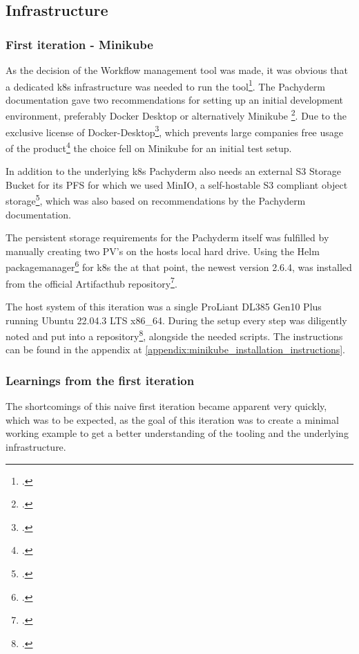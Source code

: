 
\subsection{Infrastructure}


\subsubsection{First iteration - Minikube}
\label{minikube}
As the decision of the Workflow management tool was made, it was obvious that a dedicated \ac{k8s} infrastructure was needed to run the tool\footcite{PachydermDocsOnPrem}.
The Pachyderm documentation gave two recommendations for setting up an initial development environment, preferably Docker Desktop or alternatively Minikube \footcite{PachydermDocsLocal}.
Due to the exclusive license of Docker-Desktop\footcite{DockerTermsService2022},
which prevents large companies free usage of the product\footcite{DockerFAQsDocker2021} the choice fell on Minikube for an initial test setup.

In addition to the underlying \ac{k8s} Pachyderm also needs an external S3 Storage Bucket for its \ac{PFS} for which we used MinIO,
a self-hostable S3 compliant object storage\footcite{incMinIOMinIOKubernetes}, which was also based on recommendations by the Pachyderm documentation.

The persistent storage requirements for the Pachyderm itself was fulfilled by manually creating two \ac{PV}'s on the hosts local hard drive.
Using the Helm packagemanager\footcite{HelmDocsHome} for \ac{k8s} the at that point, the newest version 2.6.4, was installed from the official Artifacthub repository\footcite{ArtifacthubPachyderm}.

The host system of this iteration was a single ProLiant DL385 Gen10 Plus running Ubuntu 22.04.3 LTS x86\_64.
During the setup every step was diligently noted and put into a repository\footcite{eckerthInstallationInstructionsMinikube}, alongside the needed scripts. 
The instructions can be found in the appendix at \ref{appendix:minikube_installation_instructions}.


\subsubsection*{Learnings from the first iteration}

The shortcomings of this naive first iteration became apparent very quickly, 
which was to be expected, as the goal of this iteration was to create a minimal working example to get a better understanding of the tooling and the underlying infrastructure.


